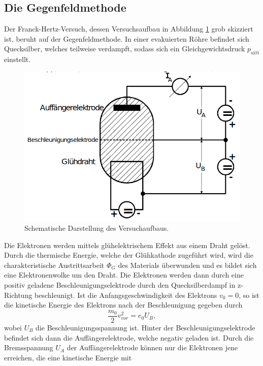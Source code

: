\subsection{Die Gegenfeldmethode}
\label{sec:gegen}
Der Franck-Hertz-Versuch, dessen Versuchsaufbau in Abbildung \ref{fig:skizze} grob skizziert ist, beruht auf der Gegenfeldmethode.
In einer evakuierten Röhre befindet sich Quecksilber, welches teilweise verdampft, sodass sich ein Gleichgewichtsdruck $p_\text{sätt}$
einstellt.
\begin{figure}[H]
    \centering
    \includegraphics[scale = 0.5]{pictures/Aufbau1.png}
    \caption{Schematische Darstellung des Versuchaufbaus. \cite{AP01}}
    \label{fig:skizze}
\end{figure}
\noindent
Die Elektronen werden mittels glühelektrischem Effekt aus einem Draht gelöst. Durch die thermische Energie, welche der
Glühkathode zugeführt wird, wird die charakteristische Austrittsarbeit $\Phi_G$ des Materials überwunden und es bildet sich eine
Elektronenwolke um den Draht. Die Elektronen werden dann durch eine positiv geladene Beschleunigungselektrode durch den Quecksilberdampf
in z-Richtung beschleunigt. Ist die Anfangsgeschwindigkeit des Elektrons $v_0=0$, so ist die kinetische Energie des Elektrons nach der
Beschleunigung gegeben durch
\begin{equation*}
    \frac{m_0}{2}v_{vor}^2=e_0U_B   ,
\end{equation*}
wobei $U_B$ die Beschleunigungsspannung ist.
Hinter der Beschleunigungselektrode befindet sich dann die Auffängerelektrode, welche negativ geladen ist. Durch die Bremsspannung
$U_A$ der Auffängerelektrode können nur die Elektronen jene erreichen, die eine kinetische Energie mit
